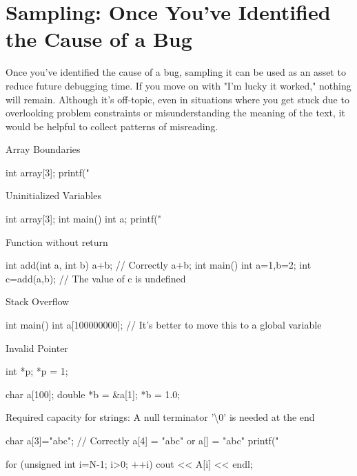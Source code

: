 
\section{Sampling: Once You've Identified the Cause of a Bug}

Once you've identified the cause of a bug, sampling it can be used as an asset to reduce future debugging time. If you move on with "I'm lucky it worked," nothing will remain. Although it's off-topic, even in situations where you get stuck due to overlooking problem constraints or misunderstanding the meaning of the text, it would be helpful to collect patterns of misreading.

Array Boundaries
\begin{cbox}
    int array[3];
    printf("
\end{cbox}

Uninitialized Variables
\begin{cbox}
    int array[3];
    int main() {
      int a;
      printf("
    }  
\end{cbox}

Function without return
\begin{cbox}
int add(int a, int b) {
  a+b; // Correctly  a+b;
}
int main() {
  int a=1,b=2;
  int c=add(a,b); // The value of c is undefined
}
\end{cbox}

Stack Overflow
\begin{cbox}
  int main() {
    int a[100000000]; // It's better to move this to a global variable
  }
\end{cbox}

Invalid Pointer
\begin{cbox}
int *p;
*p = 1;  

char a[100];
double *b = &a[1];
*b = 1.0;
\end{cbox}

Required capacity for strings: A null terminator '\textbackslash{}0' is needed at the end
\begin{cbox}  
    char a[3]="abc"; // Correctly a[4] = "abc" or a[] = "abc"
    printf("
\end{cbox}

\begin{cbox}
for (unsigned int i=N-1; i>0; ++i)
  cout << A[i] << endl;
\end{cbox}


